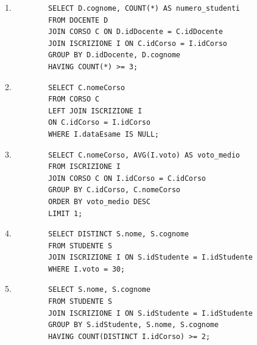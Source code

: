 \documentclass[a4paper,12pt]{article}
\begin{document}
\begin{enumerate}
	\item
	\begin{verbatim}
		SELECT D.cognome, COUNT(*) AS numero_studenti
		FROM DOCENTE D
		JOIN CORSO C ON D.idDocente = C.idDocente
		JOIN ISCRIZIONE I ON C.idCorso = I.idCorso
		GROUP BY D.idDocente, D.cognome
		HAVING COUNT(*) >= 3;
	\end{verbatim}
	
	\item
	\begin{verbatim}
		SELECT C.nomeCorso
		FROM CORSO C
		LEFT JOIN ISCRIZIONE I
		ON C.idCorso = I.idCorso
		WHERE I.dataEsame IS NULL;
	\end{verbatim}
	
	\item
	\begin{verbatim}
		SELECT C.nomeCorso, AVG(I.voto) AS voto_medio
		FROM ISCRIZIONE I
		JOIN CORSO C ON I.idCorso = C.idCorso
		GROUP BY C.idCorso, C.nomeCorso
		ORDER BY voto_medio DESC
		LIMIT 1;
	\end{verbatim}
	
	\item
	\begin{verbatim}
		SELECT DISTINCT S.nome, S.cognome
		FROM STUDENTE S
		JOIN ISCRIZIONE I ON S.idStudente = I.idStudente
		WHERE I.voto = 30;
	\end{verbatim}
	
	\item
	\begin{verbatim}
		SELECT S.nome, S.cognome
		FROM STUDENTE S
		JOIN ISCRIZIONE I ON S.idStudente = I.idStudente
		GROUP BY S.idStudente, S.nome, S.cognome
		HAVING COUNT(DISTINCT I.idCorso) >= 2;
	\end{verbatim}
	
\end{enumerate}
\end{document}
